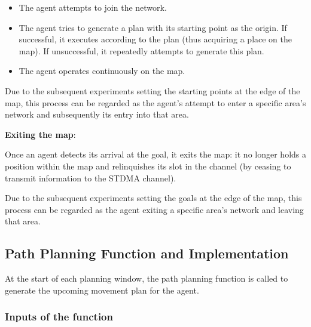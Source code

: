 \begin{itemize}
    \item The agent attempts to join the network.
    \item The agent tries to generate a plan with its starting point as the origin. If successful, it executes according to the plan (thus acquiring a place on the map). If unsuccessful, it repeatedly attempts to generate this plan.
    \item The agent operates continuously on the map.
\end{itemize}

Due to the subsequent experiments setting the starting points at the edge of the map, this process can be regarded as the agent's attempt to enter a specific area's network and subsequently its entry into that area.

\textbf{Exiting the map}:
\label{chap:exit map}

Once an agent detects its arrival at the goal, it exits the map: it no longer holds a position within the map and relinquishes its slot in the channel (by ceasing to transmit information to the STDMA channel).

Due to the subsequent experiments setting the goals at the edge of the map, this process can be regarded as the agent exiting a specific area's network and leaving that area.


\subsection{Path Planning Function and Implementation}

At the start of each planning window, the path planning function is called to generate the upcoming movement plan for the agent.

\subsubsection{Inputs of the function}

